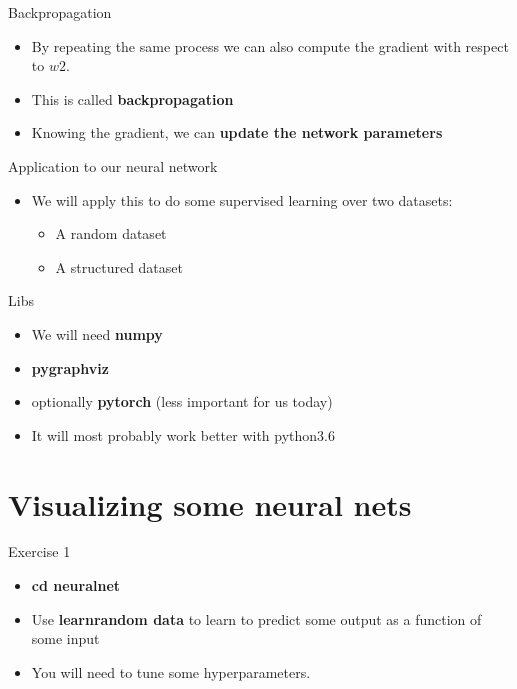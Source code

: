 \documentclass{beamer}
\begin{document}
\begin{frame}{Backpropagation}
   \begin{itemize}
       \item By repeating the same process we can also compute the gradient
           with respect to $w2$.
        \item This is called \textbf{{backpropagation}} 
        \item Knowing the gradient, we can \textbf{{update the network
            parameters}} 
   \end{itemize} 
\end{frame}

\begin{frame}{Application to our neural network}
   \begin{itemize}
       \item We will apply this to do some supervised learning over two
           datasets:
           \begin{itemize}
               \item A random dataset
                   \item A structured dataset
           \end{itemize}
   \end{itemize} 
\end{frame}

\begin{frame}{Libs}
    \begin{itemize}
        \item We will need \textbf{{numpy}} 
            \item \textbf{{pygraphviz}} 
            \item optionally \textbf{{pytorch}}  (less important for us today)
                    \item It will most probably work better with python3.6
    \end{itemize}
\end{frame}

\section{Visualizing some neural nets}%
\label{sec:visualizing_some_neural_nets}

\begin{frame}{Exercise 1}
   \begin{itemize}
       \item \textbf{{cd neural\textunderscore net}} 
        \item Use \textbf{{learn\textunderscore random \textunderscore data}}
            to learn to predict some output as a function of some input
        \item You will need to tune some hyperparameters.
   \end{itemize} 
\end{frame}
\end{document}
